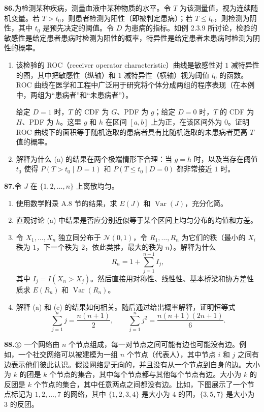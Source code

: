 \documentclass[UTF8,12pt,a4paper,fontset=fandol]{ctexart}
\begin{document}
\noindent\textbf{86.}\quad 为检测某种疾病，测量血液中某种物质的水平。令 $T$ 为该测量值，视为连续随机变量。若 $T>t_0$，则患者检测为阳性（即被判定患病）；若 $T\le t_0$，则检测为阴性，其中 $t_0$ 是预先决定的阈值。令 $D$ 为患病的指标。如例 2.3.9 所讨论，检验的敏感性是给定患者患病时检测为阳性的概率，特异性是给定患者未患病时检测为阴性的概率。
\begin{enumerate}
  \item[(a)] 该检验的 ROC（receiver operator characteristic）曲线是敏感性对 $1$ 减特异性的图，其中把敏感性（纵轴）和 $1$ 减特异性（横轴）视为阈值 $t_0$ 的函数。ROC 曲线在医学和工程中广泛用于研究将个体分成两组的程序表现（在本例中，两组为“患病者”和“未患病者”）。

  给定 $D=1$ 时，$T$ 的 CDF 为 $G$、PDF 为 $g$；给定 $D=0$ 时，$T$ 的 CDF 为 $H$、PDF 为 $h$。这里 $g$ 和 $h$ 在区间 $[a,b]$ 上为正，在该区间外为 $0$。证明 ROC 曲线下的面积等于随机选取的患病者具有比随机选取的未患病者更高 $T$ 值的概率。
  \item[(b)] 解释为什么 (a) 的结果在两个极端情形下合理：当 $g=h$ 时，以及当存在阈值 $t_0$ 使得 $P(T>t_0\mid D=1)$ 和 $P(T\le t_0\mid D=0)$ 都非常接近 $1$ 时。
\end{enumerate}

\noindent\textbf{87.}\quad 令 $J$ 在 $\{1,2,\ldots,n\}$ 上离散均匀。
\begin{enumerate}
  \item[(a)] 使用数学附录 A.8 节的结果，求 $E(J)$ 和 $\operatorname{Var}(J)$，充分化简。
  \item[(b)] 直观讨论 (a) 中结果是否应分别近似等于某个区间上均匀分布的均值和方差。
  \item[(c)] 令 $X_1,\ldots,X_n$ 独立同分布于 $\mathcal{N}(0,1)$，令 $R_1,\ldots,R_n$ 为它们的秩（最小的 $X_i$ 秩为 $1$，下一个秩为 $2$，依此类推，最大的秩为 $n$）。解释为什么
  \[
    R_n=1+\sum_{j=1}^{n-1}I_j,
  \]
  其中 $I_j=I(X_n>X_j)$。然后直接用对称性、线性性、基本桥梁和协方差性质求 $E(R_n)$ 和 $\operatorname{Var}(R_n)$。
  \item[(d)] 解释 (a) 和 (c) 的结果如何相关。随后通过给出概率解释，证明恒等式
  \[
    \sum_{j=1}^{n}j=\frac{n(n+1)}{2},\qquad
    \sum_{j=1}^{n}j^2=\frac{n(n+1)(2n+1)}{6}.
  \]
\end{enumerate}

\noindent\textbf{88.}\quad $\circledS$ 一个网络由 $n$ 个节点组成，每一对节点之间可能有边也可能没有边。例如，一个社交网络可以被建模为一组 $n$ 个节点（代表人），其中节点 $i$ 和 $j$ 之间有边表示他们彼此认识。假设网络是无向的，并且没有从一个节点到自身的边。大小为 $k$ 的团是 $k$ 个节点的集合，其中每个节点都与其他每个节点有边。大小为 $k$ 的反团是 $k$ 个节点的集合，其中任意两点之间都没有边。比如，下图展示了一个节点标记为 $1,2,\ldots,7$ 的网络，其中 $\{1,2,3,4\}$ 是大小为 $4$ 的团，$\{3,5,7\}$ 是大小为 $3$ 的反团。
\end{document}
